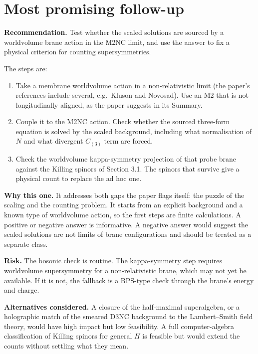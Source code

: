 \documentclass[11pt]{article}
\begin{document}
\section{Most promising follow-up}

\textbf{Recommendation.} Test whether the scaled solutions are sourced by a worldvolume brane action in the M2NC limit, and use the answer to fix a physical criterion for counting supersymmetries.

The steps are:
\begin{enumerate}
\item Take a membrane worldvolume action in a non-relativistic limit (the paper's references include several, e.g.\ Kluson and Novosad). Use an M2 that is not longitudinally aligned, as the paper suggests in its Summary.
\item Couple it to the M2NC action. Check whether the sourced three-form equation is solved by the scaled background, including what normalisation of $N$ and what divergent $C_{(3)}$ term are forced.
\item Check the worldvolume kappa-symmetry projection of that probe brane against the Killing spinors of Section 3.1. The spinors that survive give a physical count to replace the ad hoc one.
\end{enumerate}

\textbf{Why this one.} It addresses both gaps the paper flags itself: the puzzle of the scaling and the counting problem. It starts from an explicit background and a known type of worldvolume action, so the first steps are finite calculations. A positive or negative answer is informative. A negative answer would suggest the scaled solutions are not limits of brane configurations and should be treated as a separate class.

\textbf{Risk.} The bosonic check is routine. The kappa-symmetry step requires worldvolume supersymmetry for a non-relativistic brane, which may not yet be available. If it is not, the fallback is a BPS-type check through the brane's energy and charge.

\textbf{Alternatives considered.} A closure of the half-maximal superalgebra, or a holographic match of the smeared D3NC background to the Lambert--Smith field theory, would have high impact but low feasibility. A full computer-algebra classification of Killing spinors for general $H$ is feasible but would extend the counts without settling what they mean.
\end{document}
